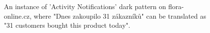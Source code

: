                 \begin{figure}[ht]
                    \RawFloats
                    \centering
                    \begin{minipage}[ht]{0.55\linewidth}
                        \strut\vspace*{-\baselineskip}\newline
                        \centering
                        \caption{An instance of 'Activity Notifications' dark pattern on flora-online.cz, where "Dnes zakoupilo 31 zákazníků" can be translated as "31 customers bought this product today".}
                        \label{fig:activity-notifications-flora-online}
                    \end{minipage}
                    \hfill
                    \begin{minipage}[ht]{0.40\linewidth}
                        \strut\vspace*{-\baselineskip}\newline
                        \centering

\end{minipage}
\end{figure}
